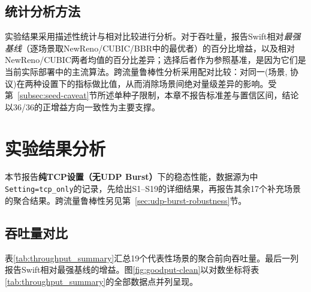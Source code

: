 \subsection{统计分析方法}

实验结果采用描述性统计与相对比较进行分析。对于吞吐量，报告Swift相对\emph{最强基线}（逐场景取NewReno/CUBIC/BBR中的最优者）的百分比增益，以及相对NewReno/CUBIC两者均值的百分比差异；选择后者作为参照基准，是因为它们是当前实际部署中的主流算法。跨流量鲁棒性分析采用配对比较：对同一(场景, 协议)在两种设置下的指标做比值，从而消除场景间绝对量级差异的影响。受第~\ref{subsec:seed-caveat}节所述单种子限制，本章不报告标准差与置信区间，结论以36/36的正增益方向一致性为主要支撑。

\section{实验结果分析}
\label{sec:results-analysis}

本节报告\textbf{纯TCP设置（无UDP Burst）}下的稳态性能，数据源为中\texttt{Setting=tcp\_only}的记录，先给出S1--S19的详细结果，再报告其余17个补充场景的聚合结果。跨流量鲁棒性另见第~\ref{sec:udp-burst-robustness}节。

\subsection{吞吐量对比}

表\ref{tab:throughput_summary}汇总19个代表性场景的聚合前向吞吐量。最后一列报告Swift相对最强基线的增益。图\ref{fig:goodput-clean}以对数坐标将表\ref{tab:throughput_summary}的全部数据点并列呈现。

